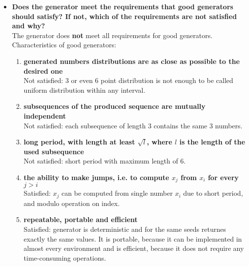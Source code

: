 \documentclass[a4paper,10pt]{article}
\begin{document}
\begin{itemize}
 \item \textbf{Does the generator meet the requirements that good generators should satisfy? If not, which of the requirements are not satisfied and why?} \\
  The generator does \textbf{not} meet all requirements for good generators. \\
  Characteristics of good generators:
   \begin{enumerate}
    \item \textbf{generated numbers distributions are as close as possible to the desired one} \\
    Not satisfied: 3 or even 6 point distribution is not enough to be called uniform distribution within any interval.
    \item \textbf{subsequences of the produced sequence are mutually independent} \\
    Not satisfied: each subsequence of length 3 contains the same 3 numbers.
    \item \textbf{long period, with length at least $\sqrt{l}$, where $l$ is the length of the used subsequence} \\
    Not satisfied: short period with maximum length of 6.
    \item \textbf{the ability to make jumps, i.e. to compute $x_j$ from $x_i$ for every $j > i$} \\
    Satisfied: $x_j$ can be computed from single number $x_i$ due to short period, and modulo operation on index.
    \item \textbf{repeatable, portable and efficient} \\
    Satisfied: generator is deterministic and for the same seeds returnes exactly the same values. It is portable, because it can be implemented in almost every environment and is efficient, because it does not require any time-consuming operations.
   \end{enumerate}
 

\end{itemize}
\end{document}
